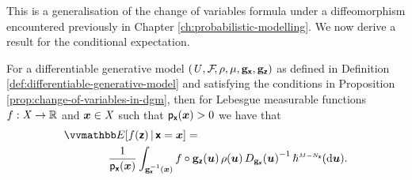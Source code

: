 This is a generalisation of the change of variables formula under a diffeomorphism encountered previously in Chapter \ref{ch:probabilistic-modelling}. We now derive a result for the conditional expectation.
\begin{proposition}\label{prop:conditional-expectations-in-dgm}
For a differentiable generative model $(\mathit{U},\mathcal{F}\kern-2pt,\rho,\mu,{\mathbf{g}}_{\boldsymbol{\mathsf{x}}},{\mathbf{g}}_{\boldsymbol{\mathsf{z}}})$ as defined in Definition \ref{def:differentiable-generative-model} and satisfying the conditions in Proposition \ref{prop:change-of-variables-in-dgm}, then for Lebesgue measurable functions $f : \mathit{X} \to \mathbb{R}$ and $\boldsymbol{x} \in \mathit{X}$ such that $\mathsf{p}_{\boldsymbol{\mathsf{x}}}(\boldsymbol{x}) > 0$ we have that
\begin{equation}\label{eq:cond-expectation-input-space}
\begin{split}
  &\expc{f(\rvct{z}) \gvn \rvct{x}=\vct{x}}
  =\,\\
  &\qquad\qquad
  \frac{1}{\pden{\rvct{x}}({\vct{x}})}
  \int_{\preimage{\genfunc_{\rvct{x}}}{\vct{x}}}
    f\circ\genfunc_{\rvct{z}}(\vct{u}) \, \rho(\vct{u}) \,
    \jacobproddet{\genfunc_{\rvct{x}}}{\vct{u}}^{-1}
  \,\haum{M-N_{\rvct{x}}}(\dr\vct{u}).
\end{split}
\end{equation}
\end{proposition}
